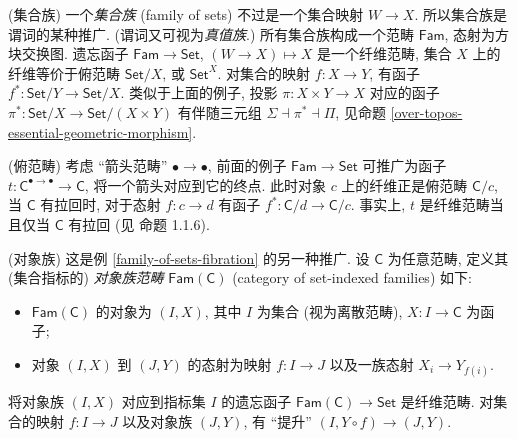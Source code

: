 \begin{example}
	[label={family-of-sets-fibration}]
	{(集合族)}
	一个\emph{集合族} (family of sets) 不过是一个集合映射 $W\to X$. 所以集合族是谓词的某种推广. (谓词又可视为\emph{真值族}.) 所有集合族构成一个范畴 $\mathsf {Fam}$, 态射为方块交换图. 遗忘函子 $\mathsf {Fam}\to\mathsf {Set}$, $(W\to X)\mapsto X$ 是一个纤维范畴, 集合 $X$ 上的纤维等价于俯范畴 $\mathsf {Set}/X$, 或 $\mathsf {Set}^X$. 对集合的映射 $f\colon X\to Y$, 有函子 $f^*\colon \mathsf {Set}/Y\to \mathsf {Set}/X$. 类似于上面的例子, 投影 $\pi\colon X\times Y\to X$ 对应的函子 $\pi^*\colon\mathsf {Set}/X\to \mathsf {Set}/{(X\times Y)}$ 有伴随三元组 $\Sigma\dashv\pi^*\dashv \Pi$, 见命题 \ref{over-topos-essential-geometric-morphism}. 
\end{example}

\begin{example}
	[label={over-category-fibration}]
	{(俯范畴)}
	考虑 ``箭头范畴'' $\bullet\longrightarrow\bullet$,
	前面的例子 $\mathsf {Fam}\to\mathsf {Set}$ 可推广为函子 $t\colon \mathsf C^{\bullet\longrightarrow\bullet}\to\mathsf C$, 将一个箭头对应到它的终点. 此时对象 $c$ 上的纤维正是俯范畴 $\mathsf C/c$, 当 $\mathsf C$ 有拉回时, 对于态射 $f\colon c\to d$ 有函子 $f^*\colon \mathsf C/d \to \mathsf C/c$. 事实上, $t$ 是纤维范畴当且仅当 $\mathsf C$ 有拉回 (见 \cite{CLTT} 命题 1.1.6).
\end{example}

\begin{example}
	{(对象族)}
	这是例 \ref{family-of-sets-fibration} 的另一种推广.
	设 $\mathsf C$ 为任意范畴, 定义其 (集合指标的) \emph{对象族范畴} $\mathsf {Fam}(\mathsf C)$ (category of set-indexed families) 如下:
	\begin{itemize}
		\item $\mathsf {Fam}(\mathsf C)$ 的对象为 $(I,X)$, 其中 $I$ 为集合 (视为离散范畴), $X\colon I\to \mathsf C$ 为函子;
		\item 对象 $(I,X)$ 到 $(J,Y)$ 的态射为映射 $f\colon I\to J$ 以及一族态射 $X_i \to Y_{f(i)}$.
	\end{itemize}
	将对象族 $(I,X)$ 对应到指标集 $I$ 的遗忘函子 $\mathsf {Fam}(\mathsf C)\to\mathsf {Set}$ 是纤维范畴.
	对集合的映射 $f\colon I\to J$ 以及对象族 $(J,Y)$,
	有 ``提升'' $(I,Y\circ f) \to (J,Y)$.
\end{example}

